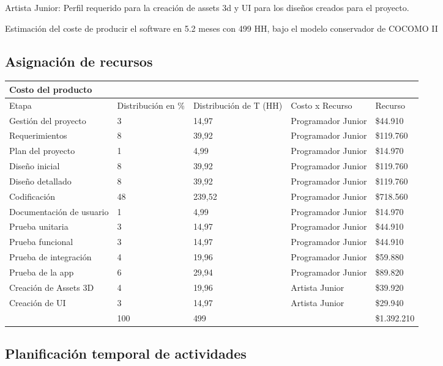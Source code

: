 Artista Junior: Perfil requerido para la creación de assets 3d y UI para los diseños creados para el proyecto.

Estimación del coste de producir el software en 5.2 meses con 499 HH, bajo el modelo conservador de COCOMO II 

\subsection{Asignación de recursos}

\begin{longtable}{|p{4cm}|p{2.2cm}|p{2.4cm}|p{2.7cm}|p{2cm}|}
\hline 
Costo del producto  &   &   &   &   \\ 
\hline 
Etapa    & Distribución en \% & Distribución de T (HH) & Costo x Recurso & Recurso \\ 
\hline 
Gestión del proyecto & 3 & 14,97 & Programador Junior & \$44.910 \\ 
\hline 
Requerimientos & 8 & 39,92 & Programador Junior & \$119.760 \\ 
\hline 
Plan del proyecto & 1 & 4,99 & Programador Junior & \$14.970 \\ 
\hline 
Diseño inicial & 8 & 39,92 & Programador Junior & \$119.760 \\ 
\hline 
Diseño detallado & 8 & 39,92 & Programador Junior & \$119.760 \\ 
\hline 
Codificación & 48 & 239,52 & Programador Junior & \$718.560 \\ 
\hline 
Documentación de usuario & 1 & 4,99 & Programador Junior & \$14.970 \\ 
\hline 
Prueba unitaria & 3 & 14,97 & Programador Junior & \$44.910 \\ 
\hline 
Prueba funcional & 3 & 14,97 & Programador Junior & \$44.910 \\ 
\hline 
Prueba de integración & 4 & 19,96 & Programador Junior & \$59.880 \\ 
\hline 
Prueba de la app & 6 & 29,94 & Programador Junior & \$89.820 \\ 
\hline 
Creación de Assets 3D & 4 & 19,96 & Artista Junior & \$39.920 \\ 
\hline 
Creación de UI & 3 & 14,97 & Artista Junior & \$29.940 \\ 
\hline 
  & 100 & 499 &   & \$1.392.210 \\ 
\hline 
\end{longtable} 



\subsection{Planificación temporal de actividades}

